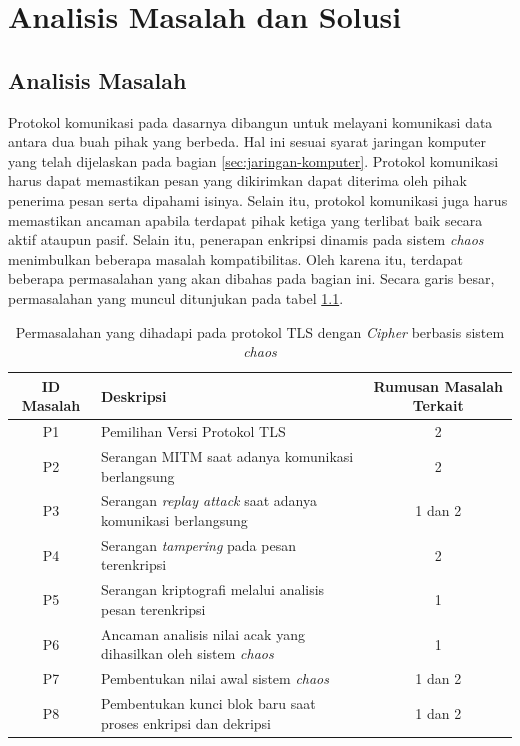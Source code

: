 

\chapter{Analisis Masalah dan Solusi}

\section{Analisis Masalah}
\label{sec:analisis-masalah}

Protokol komunikasi pada dasarnya dibangun untuk melayani komunikasi data antara dua buah pihak yang berbeda. Hal ini sesuai syarat jaringan komputer yang telah dijelaskan pada bagian \ref{sec:jaringan-komputer}. Protokol komunikasi harus dapat memastikan pesan yang dikirimkan dapat diterima oleh pihak penerima pesan serta dipahami isinya. Selain itu, protokol komunikasi juga harus memastikan ancaman apabila terdapat pihak ketiga yang terlibat baik secara aktif ataupun pasif. Selain itu, penerapan enkripsi dinamis pada sistem \emph{chaos} menimbulkan beberapa masalah kompatibilitas. Oleh karena itu, terdapat beberapa permasalahan yang akan dibahas pada bagian ini. Secara garis besar, permasalahan yang muncul ditunjukan pada tabel \ref{tab:permasalahan}.

\begin{table}[!h]
  \centering
  \caption{Permasalahan yang dihadapi pada protokol TLS dengan \emph{Cipher} berbasis sistem \emph{chaos}} \label{tab:permasalahan}
  \begin{tabular}{|c|p{6cm}|c|}
    \hline
    ID Masalah & Deskripsi & Rumusan Masalah Terkait \\
    \hline
    P1 & Pemilihan Versi Protokol TLS & 2 \\ \hline
    P2 & Serangan MITM saat adanya komunikasi berlangsung & 2 \\ \hline
    P3 & Serangan \emph{replay attack} saat adanya komunikasi berlangsung & 1 dan 2 \\ \hline
    P4 & Serangan \emph{tampering} pada pesan terenkripsi & 2 \\ \hline
    P5 & Serangan kriptografi melalui analisis pesan terenkripsi & 1 \\ \hline
    P6 & Ancaman analisis nilai acak yang dihasilkan oleh sistem \emph{chaos} & 1 \\ \hline
    P7 & Pembentukan nilai awal sistem \emph{chaos} & 1 dan 2 \\ \hline
    P8 & Pembentukan kunci blok baru saat proses enkripsi dan dekripsi & 1 dan 2 \\ \hline
  \end{tabular}
\end{table}

